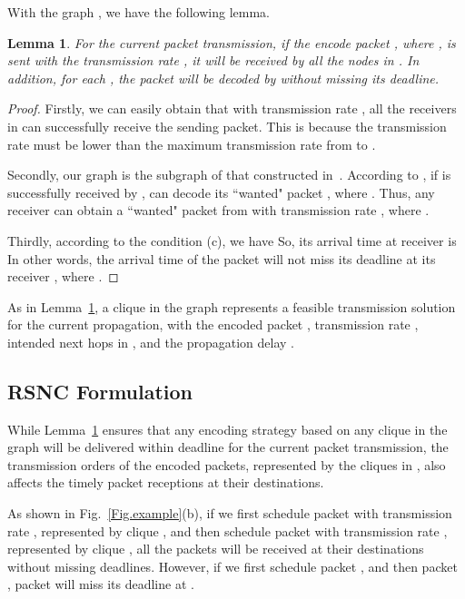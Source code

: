 \documentclass[journal]{IEEEtran}
\newtheorem{lemma}{\textbf{Lemma}}
\begin{document}
With the graph , we have the following lemma.
\vspace{-0.02in}\begin{lemma}\vspace{-0.1in}\label{lemma_graph}
For the current packet transmission, if the encode packet , where , is sent with the transmission rate , it will be received by all the nodes in . In addition, for each , the packet  will be decoded by  without missing its deadline.
\end{lemma}\vspace{-0.02in}
\begin{proof}
Firstly, we can easily obtain that with transmission rate , all the receivers in  can successfully receive the sending packet. This is because the transmission rate  must be lower than the maximum transmission rate from  to .

Secondly, our graph is the subgraph of that constructed in~\cite{ZX2010Broadcast6}. According to \cite{ZX2010Broadcast6}, if  is successfully received by ,  can decode its ``wanted" packet , where .
Thus, any receiver  can obtain a ``wanted" packet  from  with transmission rate , where .

Thirdly, according to the condition (c), we have
{\small}
So, its arrival time at receiver  is
{\small}
In other words, the arrival time of the packet  will not miss its deadline at its receiver , where .
\end{proof}

As in Lemma~\ref{lemma_graph}, a clique  in the graph represents a feasible transmission solution for the current propagation, with the encoded packet , transmission rate , intended next hops in , and the propagation delay .

\vspace{-0.1in}
\subsection{RSNC Formulation}
While Lemma~\ref{lemma_graph} ensures that any encoding strategy based on any clique in the graph will be delivered within deadline for the current packet transmission, the transmission orders of the encoded packets, represented by the cliques in , also affects the timely packet receptions at their destinations.

As shown in Fig.~\ref{Fig.example}(b), if we first schedule packet  with transmission rate , represented by clique , and then schedule packet  with transmission rate , represented by clique , all the packets will be received at their destinations without missing deadlines. However, if we first schedule packet , and then packet , packet  will miss its deadline at .
\end{document}

